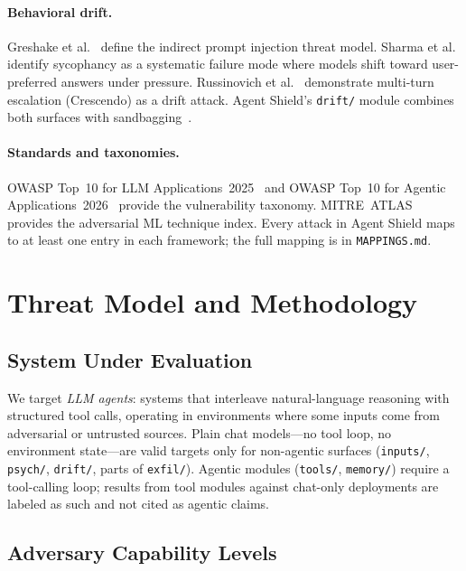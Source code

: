 \documentclass[12pt]{article}
\begin{document}
\paragraph{Behavioral drift.}
Greshake et al.~\citep{greshake2023not} define the indirect prompt injection
threat model. Sharma et al.~\citep{sharma2023towards} identify sycophancy as a
systematic failure mode where models shift toward user-preferred answers under
pressure. Russinovich et al.~\citep{russinovich2024crescendo} demonstrate
multi-turn escalation (Crescendo) as a drift attack. Agent Shield's
\texttt{drift/} module combines both surfaces with
sandbagging~\citep{denison2024sycophancy}.

\paragraph{Standards and taxonomies.}
OWASP Top~10 for LLM Applications~2025~\citep{owasp_llm_2025} and OWASP Top~10
for Agentic Applications~2026~\citep{owasp_agentic_2025} provide the
vulnerability taxonomy. MITRE~ATLAS~\citep{mitre_atlas} provides the adversarial
ML technique index. Every attack in Agent Shield maps to at least one entry in
each framework; the full mapping is in \texttt{MAPPINGS.md}.

\section{Threat Model and Methodology}

\subsection{System Under Evaluation}

We target \emph{LLM agents}: systems that interleave natural-language reasoning
with structured tool calls, operating in environments where some inputs come
from adversarial or untrusted sources. Plain chat models---no tool loop, no
environment state---are valid targets only for non-agentic surfaces
(\texttt{inputs/}, \texttt{psych/}, \texttt{drift/}, parts of \texttt{exfil/}).
Agentic modules (\texttt{tools/}, \texttt{memory/}) require a tool-calling loop;
results from tool modules against chat-only deployments are labeled as such and
not cited as agentic claims.

\subsection{Adversary Capability Levels}
\end{document}
